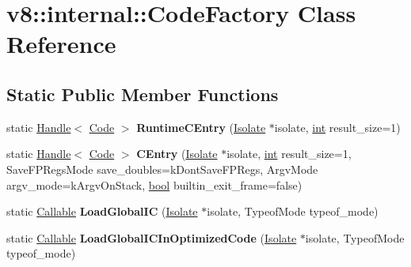 \hypertarget{classv8_1_1internal_1_1CodeFactory}{}\section{v8\+:\+:internal\+:\+:Code\+Factory Class Reference}
\label{classv8_1_1internal_1_1CodeFactory}
\subsection*{Static Public Member Functions}
\begin{DoxyCompactItemize}
\item 
\mbox{\label{classv8_1_1internal_1_1CodeFactory_a1189a094d414acd8324f19f547f9ffa0}} 
static \mbox{\hyperlink{classv8_1_1internal_1_1Handle}{Handle}}$<$ \mbox{\hyperlink{classv8_1_1internal_1_1Code}{Code}} $>$ {\bfseries Runtime\+C\+Entry} (\mbox{\hyperlink{classv8_1_1internal_1_1Isolate}{Isolate}} $\ast$isolate, \mbox{\hyperlink{classint}{int}} result\+\_\+size=1)
\item 
\mbox{\label{classv8_1_1internal_1_1CodeFactory_ab34206ea8fe36670cd4d4539479ac576}} 
static \mbox{\hyperlink{classv8_1_1internal_1_1Handle}{Handle}}$<$ \mbox{\hyperlink{classv8_1_1internal_1_1Code}{Code}} $>$ {\bfseries C\+Entry} (\mbox{\hyperlink{classv8_1_1internal_1_1Isolate}{Isolate}} $\ast$isolate, \mbox{\hyperlink{classint}{int}} result\+\_\+size=1, Save\+F\+P\+Regs\+Mode save\+\_\+doubles=k\+Dont\+Save\+F\+P\+Regs, Argv\+Mode argv\+\_\+mode=k\+Argv\+On\+Stack, \mbox{\hyperlink{classbool}{bool}} builtin\+\_\+exit\+\_\+frame=false)
\item 
\mbox{\label{classv8_1_1internal_1_1CodeFactory_a6154eb7d584d0fdcf454b8d31fad4c3a}} 
static \mbox{\hyperlink{classv8_1_1internal_1_1Callable}{Callable}} {\bfseries Load\+Global\+IC} (\mbox{\hyperlink{classv8_1_1internal_1_1Isolate}{Isolate}} $\ast$isolate, Typeof\+Mode typeof\+\_\+mode)
\item 
\mbox{\label{classv8_1_1internal_1_1CodeFactory_a5ef11528c6c1e3e09577ea5fa3fcebb4}} 
static \mbox{\hyperlink{classv8_1_1internal_1_1Callable}{Callable}} {\bfseries Load\+Global\+I\+C\+In\+Optimized\+Code} (\mbox{\hyperlink{classv8_1_1internal_1_1Isolate}{Isolate}} $\ast$isolate, Typeof\+Mode typeof\+\_\+mode)

\end{DoxyCompactItemize}
